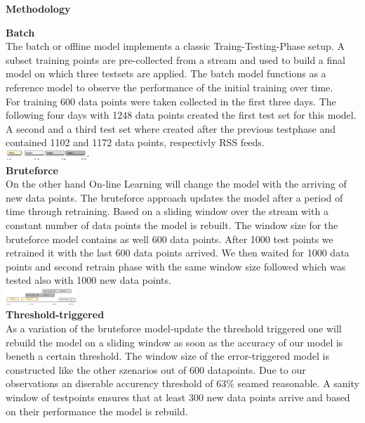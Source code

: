 \begin{center} \textbf{\huge Methodology} \end{center}
\textbf{\large Batch}\\
The batch or offline model implements a classic Traing-Testing-Phase setup. A subset training points are pre-collected from a stream and used to build a final model on which three testsets are applied. The batch model functions as a reference model to observe the performance of the initial training over time. \\
For training 600 data points were taken collected in the first three days. The following four days with 1248 data points created the first test set for this model. A second and a third test set where created after the previous testphase and contained 1102 and 1172 data points, respectivly RSS feeds.\\
\includegraphics[width=0.24\textwidth]{./time_models/OfflineModel.png}\\
\textbf{\large Bruteforce}\\
On the other hand On-line Learning will change the model with the arriving of new data points.
The bruteforce approach updates the model after a period of time through retraining. Based on a sliding window over the stream with a constant number of data points
the model is rebuilt. The window size for the bruteforce model contains as well 600 data points. After 1000 test points we retrained it with the last 600 data points arrived. We then waited for 1000 data points and second retrain phase with the same window size followed which was tested also with 1000 new data points.\\
\includegraphics[width=0.2\textwidth]{./time_models/BruteforceModel}\\
\textbf{\large Threshold-triggered}\\
As a variation of the bruteforce model-update the threshold triggered one will rebuild the model on a sliding window as soon as the accuracy of our model is beneth a certain threshold. The window size of the error-triggered model is constructed like the other szenarios out of 600 datapoints. Due to our observations an diserable accurency threshold of 63\% seamed reasonable. A sanity window of testpoints ensures that at least 300 new data points arrive and based on their performance the model is rebuild.\\
